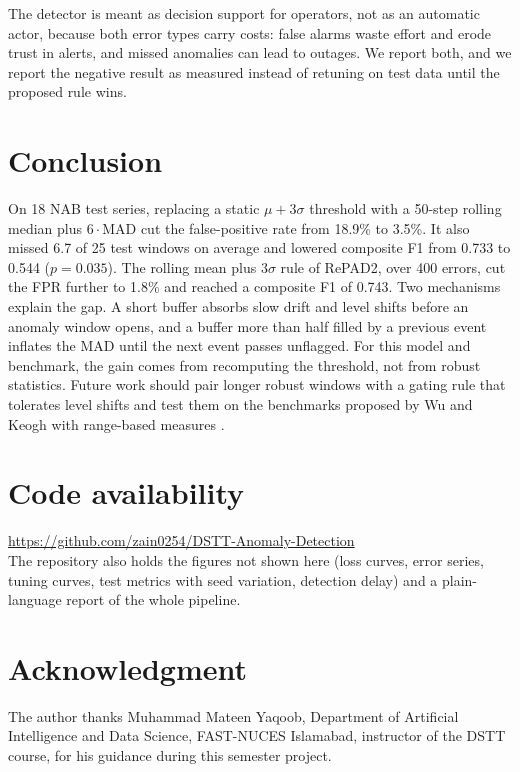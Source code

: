 \documentclass[conference]{IEEEtran}
\begin{document}
The detector is meant as decision support for operators, not as an automatic actor, because both error types carry costs: false alarms waste effort and erode trust in alerts, and missed anomalies can lead to outages. We report both, and we report the negative result as measured instead of retuning on test data until the proposed rule wins.

\section{Conclusion}

On 18 NAB test series, replacing a static $\mu + 3\sigma$ threshold with a 50-step rolling median plus $6\cdot$MAD cut the false-positive rate from 18.9\% to 3.5\%. It also missed 6.7 of 25 test windows on average and lowered composite F1 from 0.733 to 0.544 ($p = 0.035$). The rolling mean plus $3\sigma$ rule of RePAD2, over 400 errors, cut the FPR further to 1.8\% and reached a composite F1 of 0.743. Two mechanisms explain the gap. A short buffer absorbs slow drift and level shifts before an anomaly window opens, and a buffer more than half filled by a previous event inflates the MAD until the next event passes unflagged. For this model and benchmark, the gain comes from recomputing the threshold, not from robust statistics. Future work should pair longer robust windows with a gating rule that tolerates level shifts and test them on the benchmarks proposed by Wu and Keogh \cite{wu2023} with range-based measures \cite{paparrizos2022}.

\section*{Code availability}
\url{https://github.com/zain0254/DSTT-Anomaly-Detection}\\
The repository also holds the figures not shown here (loss curves, error series, tuning curves, test metrics with seed variation, detection delay) and a plain-language report of the whole pipeline.

\section*{Acknowledgment}
The author thanks Muhammad Mateen Yaqoob, Department of Artificial Intelligence and Data Science, FAST-NUCES Islamabad, instructor of the DSTT course, for his guidance during this semester project.



\end{document}
